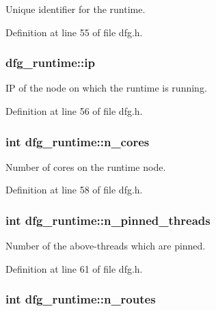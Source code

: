 Unique identifier for the runtime. 



Definition at line 55 of file dfg.\-h.

\hypertarget{structdfg__runtime_ad0f9d4865c5f177d2062ade3ddf407b4}{
\subsubsection[{ip}]{ dfg\-\_\-runtime\-::ip}}\label{structdfg__runtime_ad0f9d4865c5f177d2062ade3ddf407b4}


I\-P of the node on which the runtime is running. 



Definition at line 56 of file dfg.\-h.

\hypertarget{structdfg__runtime_a70d2e7498c96220b9483710588bdd07c}{
\subsubsection[{n\-\_\-cores}]{\setlength{\rightskip}{0pt plus 5cm}int dfg\-\_\-runtime\-::n\-\_\-cores}}\label{structdfg__runtime_a70d2e7498c96220b9483710588bdd07c}


Number of cores on the runtime node. 



Definition at line 58 of file dfg.\-h.

\hypertarget{structdfg__runtime_acb3779eccb9614f48771aeb3e16394bc}{
\subsubsection[{n\-\_\-pinned\-\_\-threads}]{\setlength{\rightskip}{0pt plus 5cm}int dfg\-\_\-runtime\-::n\-\_\-pinned\-\_\-threads}}\label{structdfg__runtime_acb3779eccb9614f48771aeb3e16394bc}


Number of the above-\/threads which are pinned. 



Definition at line 61 of file dfg.\-h.

\hypertarget{structdfg__runtime_a410c8ded04d9b53061dbb939446ac26a}{
\subsubsection[{n\-\_\-routes}]{\setlength{\rightskip}{0pt plus 5cm}int dfg\-\_\-runtime\-::n\-\_\-routes}}\label{structdfg__runtime_a410c8ded04d9b53061dbb939446ac26a}


